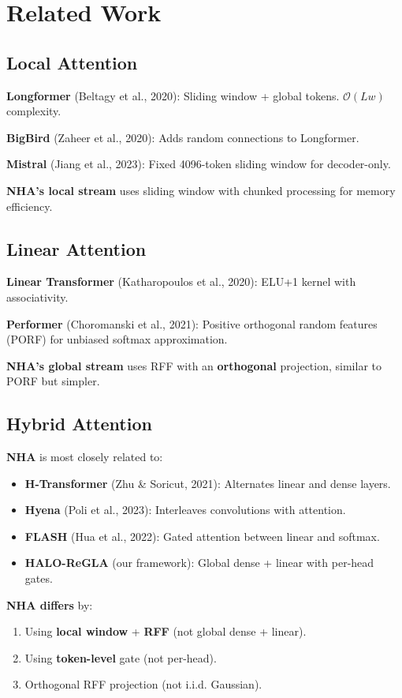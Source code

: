 
\section{Related Work}

\subsection{Local Attention}

\textbf{Longformer} (Beltagy et al., 2020): Sliding window + global tokens. 
$\mathcal{O}(L w)$ complexity.

\textbf{BigBird} (Zaheer et al., 2020): Adds random connections to Longformer.

\textbf{Mistral} (Jiang et al., 2023): Fixed 4096-token sliding window for 
decoder-only.

\textbf{NHA's local stream} uses sliding window with chunked processing for 
memory efficiency.

\subsection{Linear Attention}

\textbf{Linear Transformer} (Katharopoulos et al., 2020): ELU+1 kernel with 
associativity.

\textbf{Performer} (Choromanski et al., 2021): Positive orthogonal random features 
(PORF) for unbiased softmax approximation.

\textbf{NHA's global stream} uses RFF with an \textbf{orthogonal} projection, similar 
to PORF but simpler.

\subsection{Hybrid Attention}

\textbf{NHA} is most closely related to:

\begin{itemize}
\item \textbf{H-Transformer} (Zhu \& Soricut, 2021): Alternates linear and dense layers.
\item \textbf{Hyena} (Poli et al., 2023): Interleaves convolutions with attention.
\item \textbf{FLASH} (Hua et al., 2022): Gated attention between linear and softmax.
\item \textbf{HALO-ReGLA} (our framework): Global dense + linear with per-head gates.

\end{itemize}
\textbf{NHA differs} by:
\begin{enumerate}
\item Using \textbf{local window} + \textbf{RFF} (not global dense + linear).
\item Using \textbf{token-level} gate (not per-head).
\item Orthogonal RFF projection (not i.i.d. Gaussian).

\end{enumerate}
